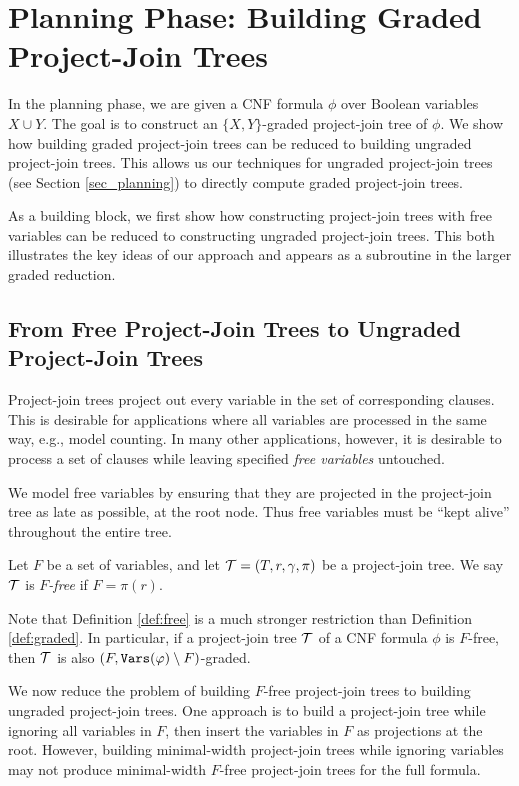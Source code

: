 \section{Planning Phase: Building Graded Project-Join Trees}
\label{sec:procount:planning}

In the planning phase, we are given a CNF formula $\phi$ over Boolean variables $X \cup Y$.
The goal is to construct an $\{X, Y\}$-graded project-join tree of $\phi$.
We show how building graded project-join trees can be reduced to building ungraded project-join trees. 
This allows us our techniques for ungraded project-join trees (see Section \ref{sec_planning}) to directly compute graded project-join trees.

As a building block, we first show how constructing project-join trees with free variables can be reduced to constructing ungraded project-join trees. This both illustrates the key ideas of our approach and appears as a subroutine in the larger graded reduction.

\subsection{From Free Project-Join Trees to Ungraded Project-Join Trees}
\label{sec:planning:free}
Project-join trees project out every variable in the set of corresponding clauses. This is desirable for applications where all variables are processed in the same way, e.g., model counting. In many other applications, however, it is desirable to process a set of clauses while leaving specified \emph{free variables} untouched. 
 
We model free variables by ensuring that they are projected in the project-join tree as late as possible, at the root node. Thus free variables must be ``kept alive'' throughout the entire tree.
\begin{definition}
\label{def:free}
Let $F$ be a set of variables, and let $\mathcal{T} = (T, r, \gamma, \pi)$ be a project-join tree. We say $\mathcal{T}$ is \emph{$F$-free} if $F = \pi(r)$.
\end{definition}

Note that Definition \ref{def:free} is a much stronger restriction than Definition \ref{def:graded}. 
In particular, if a project-join tree $\mathcal{T}$ of a CNF formula $\phi$ is $F$-free, then $\mathcal{T}$ is also $(F, \texttt{\upshape Vars}(\varphi) \setminus F)$-graded.

We now reduce the problem of building $F$-free project-join trees to building ungraded project-join trees. One approach is to build a project-join tree while ignoring all variables in $F$, then insert the variables in $F$ as projections at the root. 
However, building minimal-width project-join trees while ignoring variables may not produce minimal-width $F$-free project-join trees for the full formula.

